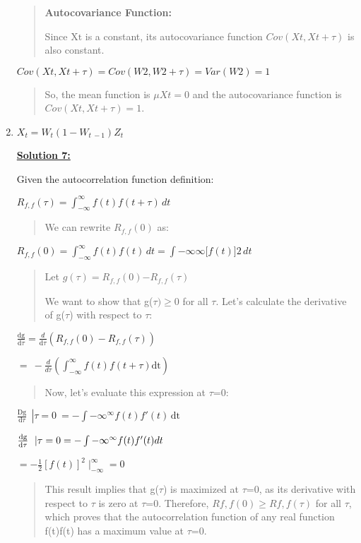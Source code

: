 \documentclass{article}
\begin{document}
\begin{enumerate}
\begin{quote}
    \textbf{Autocovariance Function:}

    Since \(\text{Xt}\)\hspace{0pt} is a constant, its autocovariance
    function \(Cov(Xt,Xt + \tau)\) is also constant.
    \end{quote}

    $Cov(Xt,Xt + \tau) = Cov(W2,W2 + \tau) = Var(W2) = 1$

    \begin{quote}
    So, the mean function is \(\mu Xt = 0\) and the autocovariance function
    is \(Cov(Xt,Xt + \tau) = 1\).
    \end{quote}

\newpage
\item

    \(X_{t} = W_{t}\left( 1 - W_{t\  - 1} \right)Z_{t}\)

    \textbf{\underline{Solution 7:}}

    Given the autocorrelation function definition:

    $R_{f,f}(\tau) = \int_{- \infty}^{\infty}{f(t)f(t + \tau)\, dt}$

    \begin{quote}
    We can rewrite \(R_{f,f}(0)\) as:
    \end{quote}

    $R_{f,f}(0) = \int_{- \infty}^{\infty}{f(t)f(t)\, dt = \int - \infty\infty\lbrack f(t)\rbrack 2\, dt}$

    \begin{quote}
    Let \(g(\tau) = R_{f,f}(0)\mathbf{-}R_{f,f}(\tau)\)

    We want to show that g($\tau)\geq$0 for all $\tau$. Let's calculate the derivative of g($\tau$) with respect to $\tau$:
    \end{quote}

    $\frac{\text{dg}}{\text{d$\tau$}} = \frac{d}{\text{d$\tau$}}(R_{f,f}(0) - R_{f,f}(\tau))$

    $= \  - \frac{d}{d\tau}(\int_{- \infty}^{\infty}{f(t)f(t + \tau)\text{dt}})$

    \begin{quote}
    Now, let's evaluate this expression at $\tau$=0:
    \end{quote}

    $\frac{\text{Dg}}{\text{d$\tau$}}\ \left. \  \right|{\tau = 0}\  = - \int{- \infty}^{\infty}{f(t)f'(t)\,\text{dt}}$

    $\frac{\text{dg}}{\text{d$\tau$}}\left. \  \right|{\text{\!$\tau$} = 0} = - \int{- \infty}^{\infty}{f(t)f'(t)dt}$

    $= - \frac{1}{2}\left\lbrack f(t) \right\rbrack^{2} \mid_{- \infty}^{\infty} = 0$

    \begin{quote}
    This result implies that g($\tau$) is maximized at $\tau$=0, as its derivative
    with respect to $\tau$ is zero at $\tau$=0. Therefore, \(Rf,f(0) \geq Rf,f(\tau)\)
    for all $\tau$, which proves that the autocorrelation function of any real
    function f(t)f(t) has a maximum value at $\tau$=0.
    \end{quote}

\end{enumerate}
\end{document}
